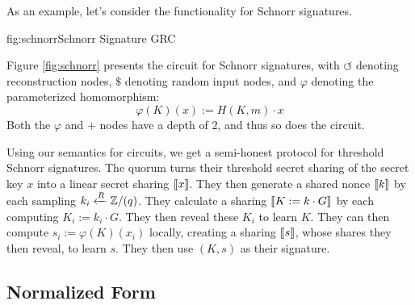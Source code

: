 As an example, let's consider the functionality for Schnorr signatures.

\begin{afigure}{fig:schnorr}{Schnorr Signature GRC}
\end{afigure}

Figure \ref{fig:schnorr} presents the circuit for Schnorr signatures,
with $\circlearrowleft$ denoting reconstruction nodes,
$\$$ denoting random input nodes, and $\varphi$ denoting
the parameterized homomorphism:
$$
\varphi(K)(x) := H(K, m) \cdot x
$$
Both the $\varphi$ and $+$ nodes have a depth of $2$, and thus so
does the circuit.

Using our semantics for circuits, we get a semi-honest protocol for
threshold Schnorr signatures. The quorum turns their threshold
secret sharing of the secret key $x$ into a linear secret sharing $\llbracket x\rrbracket$.
They then generate a shared nonce $\llbracket k\rrbracket$ by each sampling
$k_i \xleftarrow{R} \mathbb{Z}/(q)$. They calculate a sharing $\llbracket K := k \cdot G\rrbracket$
by each computing $K_i := k_i \cdot G$. They then reveal these $K_i$ to
learn $K$. They can then compute $s_i := \varphi(K)(x_i)$ locally,
creating a sharing $\llbracket s\rrbracket$, whose shares they then reveal,
to learn $s$. They then use $(K, s)$ as their signature.

\subsection{Normalized Form}


